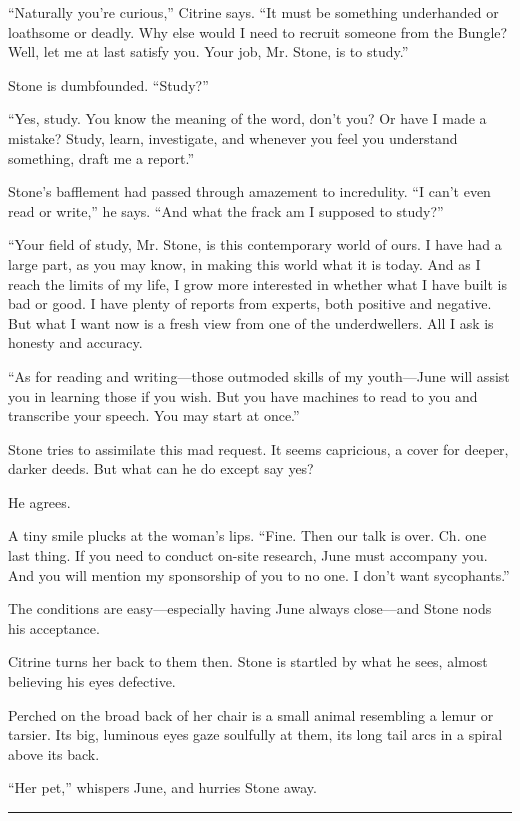 ``Naturally you're curious,'' Citrine says. ``It must be something underhanded or loathsome or deadly. Why else would I need to recruit someone from the Bungle? Well, let me at last satisfy you. Your job, Mr. Stone, is to study.''

Stone is dumbfounded. ``Study?''

``Yes, study. You know the meaning of the word, don't you? Or have I made a mistake? Study, learn, investigate, and whenever you feel you understand something, draft me a report.''

Stone's bafflement had passed through amazement to incredulity. ``I can't even read or write,'' he says. ``And what the frack am I supposed to study?''

``Your field of study, Mr. Stone, is this contemporary world of ours. I have had a large part, as you may know, in making this world what it is today. And as I reach the limits of my life, I grow more interested in whether what I have built is bad or good. I have plenty of reports from experts, both positive and negative. But what I want now is a fresh view from one of the underdwellers. All I ask is honesty and accuracy.

``As for reading and writing---those outmoded skills of my youth---June will assist you in learning those if you wish. But you have machines to read to you and transcribe your speech. You may start at once.''

Stone tries to assimilate this mad request. It seems capricious, a cover for deeper, darker deeds. But what can he do except say yes?

He agrees.

A tiny smile plucks at the woman's lips. ``Fine. Then our talk is over. Ch. one last thing. If you need to conduct on-site research, June must accompany you. And you will mention my sponsorship of you to no one. I don't want sycophants.''

The conditions are easy---especially having June always close---and Stone nods his acceptance.

Citrine turns her back to them then. Stone is startled by what he sees, almost believing his eyes defective.

Perched on the broad back of her chair is a small animal resembling a lemur or tarsier. Its big, luminous eyes gaze soulfully at them, its long tail arcs in a spiral above its back.

``Her pet,'' whispers June, and hurries Stone away.

\fancybreak{* * *}

